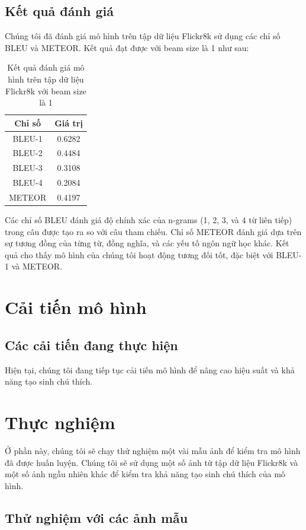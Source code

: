 \documentclass[conference]{IEEEtran}
\begin{document}
\subsection{Kết quả đánh giá}

Chúng tôi đã đánh giá mô hình trên tập dữ liệu Flickr8k sử dụng các chỉ số BLEU và METEOR. Kết quả đạt được với beam size là 1 như sau:

\begin{table}[h]
\centering
\begin{tabular}{|c|c|}
\hline
\textbf{Chỉ số} & \textbf{Giá trị} \\
\hline
BLEU-1 & 0.6282 \\
\hline
BLEU-2 & 0.4484 \\
\hline
BLEU-3 & 0.3108 \\
\hline
BLEU-4 & 0.2084 \\
\hline
METEOR & 0.4197 \\
\hline
\end{tabular}
\caption{Kết quả đánh giá mô hình trên tập dữ liệu Flickr8k với beam size là 1}
\label{tab:evaluation}
\end{table}

Các chỉ số BLEU đánh giá độ chính xác của n-grams (1, 2, 3, và 4 từ liên tiếp) trong câu được tạo ra so với câu tham chiếu. Chỉ số METEOR đánh giá dựa trên sự tương đồng của từng từ, đồng nghĩa, và các yếu tố ngôn ngữ học khác. Kết quả cho thấy mô hình của chúng tôi hoạt động tương đối tốt, đặc biệt với BLEU-1 và METEOR.

\section{Cải tiến mô hình}
\subsection{Các cải tiến đang thực hiện}

Hiện tại, chúng tôi đang tiếp tục cải tiến mô hình để nâng cao hiệu suất và khả năng tạo sinh chú thích.

\section{Thực nghiệm}
Ở phần này, chúng tôi sẽ chạy thử nghiệm một vài mẫu ảnh để kiểm tra mô hình đã được huấn luyện. Chúng tôi sẽ sử dụng một số ảnh từ tập dữ liệu Flickr8k và một số ảnh ngẫu nhiên khác để kiểm tra khả năng tạo sinh chú thích của mô hình.
\subsection{Thử nghiệm với các ảnh mẫu}
\end{document}
